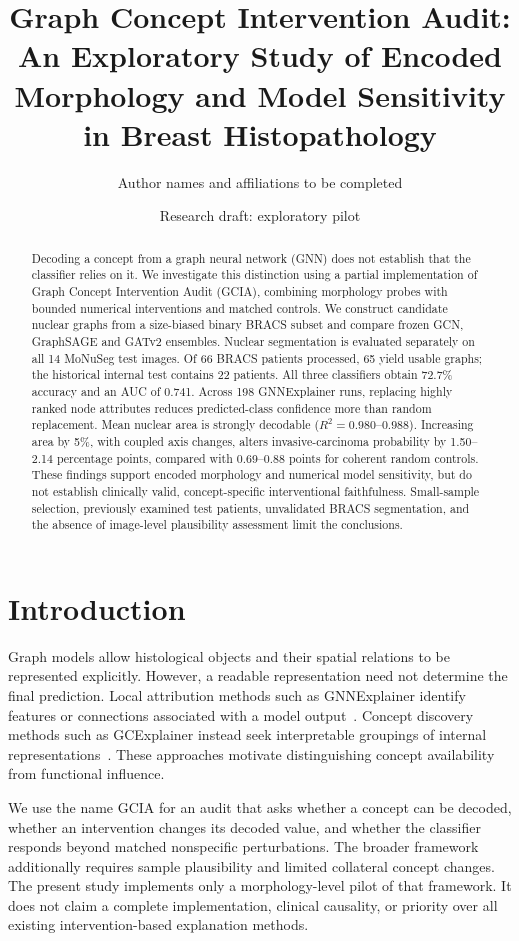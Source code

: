 \documentclass[11pt,a4paper]{article}
\title{Graph Concept Intervention Audit: An Exploratory Study of Encoded Morphology and Model Sensitivity in Breast Histopathology}
\author{Author names and affiliations to be completed}
\date{Research draft: exploratory pilot}
\begin{document}
\maketitle

\begin{abstract}
Decoding a concept from a graph neural network (GNN) does not establish that the classifier relies on it. We investigate this distinction using a partial implementation of Graph Concept Intervention Audit (GCIA), combining morphology probes with bounded numerical interventions and matched controls. We construct candidate nuclear graphs from a size-biased binary BRACS subset and compare frozen GCN, GraphSAGE and GATv2 ensembles. Nuclear segmentation is evaluated separately on all 14 MoNuSeg test images. Of 66 BRACS patients processed, 65 yield usable graphs; the historical internal test contains 22 patients. All three classifiers obtain 72.7\% accuracy and an AUC of 0.741. Across 198 GNNExplainer runs, replacing highly ranked node attributes reduces predicted-class confidence more than random replacement. Mean nuclear area is strongly decodable ($R^2=0.980$--$0.988$). Increasing area by 5\%, with coupled axis changes, alters invasive-carcinoma probability by 1.50--2.14 percentage points, compared with 0.69--0.88 points for coherent random controls. These findings support encoded morphology and numerical model sensitivity, but do not establish clinically valid, concept-specific interventional faithfulness. Small-sample selection, previously examined test patients, unvalidated BRACS segmentation, and the absence of image-level plausibility assessment limit the conclusions.
\end{abstract}

\section{Introduction}
Graph models allow histological objects and their spatial relations to be represented explicitly. However, a readable representation need not determine the final prediction. Local attribution methods such as GNNExplainer identify features or connections associated with a model output~\cite{ying2019}. Concept discovery methods such as GCExplainer instead seek interpretable groupings of internal representations~\cite{magister2021}. These approaches motivate distinguishing concept availability from functional influence.

We use the name GCIA for an audit that asks whether a concept can be decoded, whether an intervention changes its decoded value, and whether the classifier responds beyond matched nonspecific perturbations. The broader framework additionally requires sample plausibility and limited collateral concept changes. The present study implements only a morphology-level pilot of that framework. It does not claim a complete implementation, clinical causality, or priority over all existing intervention-based explanation methods.
\end{document}
